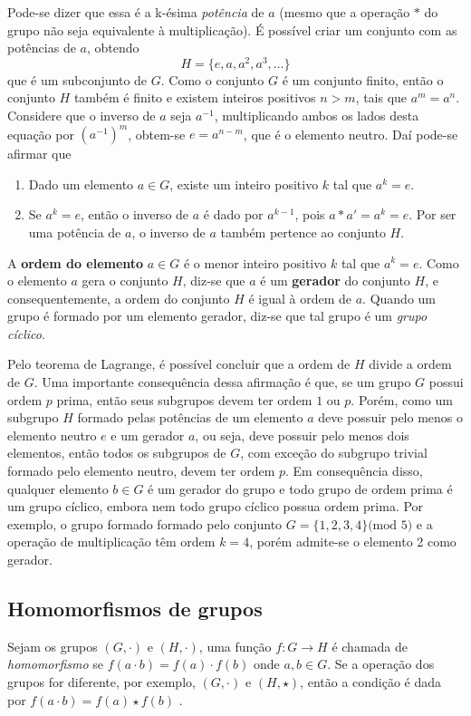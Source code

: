 Pode-se dizer que essa é a k-ésima \textit{potência} de $a$ (mesmo que a operação $*$ do grupo não seja equivalente à multiplicação). É possível criar um conjunto com as potências de $a$, obtendo
$$
H = \{e, a, a^2, a^3, \ldots\}
$$
que é um subconjunto de $G$. Como o conjunto $G$ é um conjunto finito, então o conjunto $H$ também é finito e existem inteiros positivos $n > m$, tais que $a^m = a^n$. Considere que o inverso de $a$ seja $a^{-1}$, multiplicando ambos os lados desta equação por $(a^{-1})^m$, obtem-se $e = a^{n-m}$, que é o elemento neutro.\cite{Coutinho:2014} Daí pode-se afirmar que
\begin{enumerate}
\item Dado um elemento $a \in G$, existe um inteiro positivo $k$ tal que $a^k = e$.
\item Se $a^k = e$, então o inverso de $a$ é dado por $a^{k-1}$, pois $a * a' = a^k = e$. Por ser uma potência de $a$, o inverso de $a$ também pertence ao conjunto $H$.
\end{enumerate}

A \textbf{ordem do elemento} $a \in G$ é o menor inteiro positivo $k$ tal que $a^k = e$. Como o elemento $a$ gera o conjunto $H$, diz-se que $a$ é um \textbf{gerador} do conjunto $H$, e consequentemente, a ordem do conjunto $H$ é igual à ordem de $a$. Quando um grupo é formado por um elemento gerador, diz-se que tal grupo é um \textit{grupo cíclico}. \cite{Coutinho:2014}

Pelo teorema de Lagrange, é possível concluir que a ordem de $H$ divide a ordem de $G$. Uma importante consequência dessa afirmação é que, se um grupo $G$ possui ordem $p$ prima, então seus subgrupos devem ter ordem $1$ ou $p$. Porém, como um subgrupo $H$ formado pelas potências de um elemento $a$ deve possuir pelo menos o elemento neutro $e$ e um gerador $a$, ou seja, deve possuir pelo menos dois elementos, então todos os subgrupos de $G$, com exceção do subgrupo trivial formado pelo elemento neutro, devem ter ordem $p$. Em consequência disso, qualquer elemento $b \in G$ é um gerador do grupo e todo grupo de ordem prima é um grupo cíclico, embora nem todo grupo cíclico possua ordem prima. Por exemplo, o grupo formado formado pelo conjunto $G=\{1,2,3,4\} \mbox{(mod 5)}$ e a operação de multiplicação têm ordem $k = 4$, porém admite-se o elemento 2 como gerador. \cite{Coutinho:2014}

%
%
\subsection{Homomorfismos de grupos}
Sejam os grupos $(G, \cdot)$ e $(H, \cdot)$, uma função $f: G \rightarrow H$ é chamada de \textit{homomorfismo} se $f(a \cdot b) = f(a) \cdot f(b)$ onde $a, b \in G$. Se a operação dos grupos for diferente, por exemplo, $(G, \cdot)$ e $(H, \star)$, então a condição é dada por $f(a \cdot b) = f(a) \star f(b)$ \cite{Gilbert:2004}.

